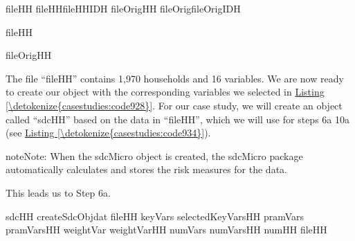 \documentclass[letterpaper,10pt,english]{sphinxmanual}
\begin{document}
\def\sphinxLiteralBlockLabel{\label{\detokenize{casestudies:code930}}}
%
\begin{sphinxVerbatim}[commandchars=\\\{\},numbers=left,firstnumber=1,stepnumber=1]
fileHH  fileHH\PYG{p}{[}fileHHIDH\PYG{p}{]} 
fileOrigHH  fileOrig\PYG{p}{[}fileOrigIDH\PYG{p}{]} 

fileHH

fileOrigHH
\end{sphinxVerbatim}

The file “fileHH” contains 1,970 households and 16 variables. We are now
ready to create our  object with the corresponding variables
we selected in \hyperref[\detokenize{casestudies:code928}]{Listing \ref{\detokenize{casestudies:code928}}}. For our case study, we will create an
 object called “sdcHH” based on the data in “fileHH”, which we
will use for steps 6a \textendash{} 10a (see \hyperref[\detokenize{casestudies:code934}]{Listing \ref{\detokenize{casestudies:code934}}}).

\begin{sphinxadmonition}{note}{Note:}
When the sdcMicro object is created, the sdcMicro package automatically
calculates and stores the risk measures for the data.
\end{sphinxadmonition}

This leads us to Step 6a.

\def\sphinxLiteralBlockLabel{\label{\detokenize{casestudies:code931}}}
%
\begin{sphinxVerbatim}[commandchars=\\\{\},numbers=left,firstnumber=1,stepnumber=1]
sdcHH  createSdcObjdat  fileHH keyVars  selectedKeyVarsHH
                      pramVars  pramVarsHH weightVar  weightVarHH numVars  numVarsHH
numHH  fileHH\PYG{p}{[}\PYG{p}{]} 
\end{sphinxVerbatim}
\end{document}
